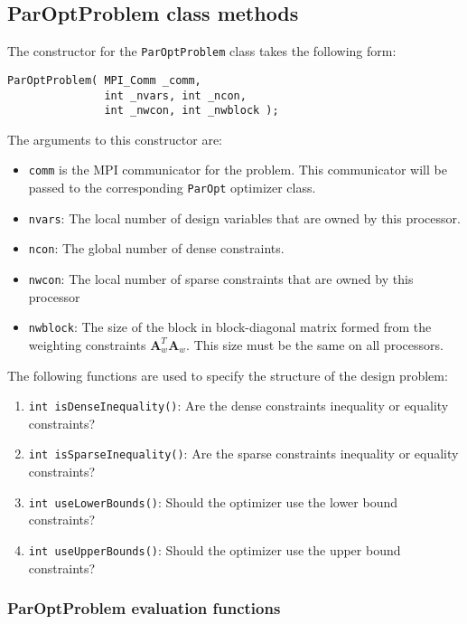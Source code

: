 \documentclass[12pt]{article}
\newcommand{\mb}{\mathbf}
\begin{document}
\subsection{ParOptProblem class methods}

The constructor for the \texttt{ParOptProblem} class takes the following form:
%
\begin{verbatim}
ParOptProblem( MPI_Comm _comm,
               int _nvars, int _ncon,
               int _nwcon, int _nwblock );
\end{verbatim}

The arguments to this constructor are:
\begin{itemize}
\item \texttt{comm} is the MPI communicator for the problem. 
This communicator will be passed to the corresponding \texttt{ParOpt} optimizer class.

\item \texttt{nvars}: The local number of design variables that are owned by this processor.

\item \texttt{ncon}: The global number of dense constraints.

\item \texttt{nwcon}: The local number of sparse constraints that are owned by this processor

\item \texttt{nwblock}: The size of the block in block-diagonal matrix formed from the weighting constraints $\mb{A}_{w}^{T}\mb{A}_{w}$. This size must be the same on all processors.
\end{itemize}

The following functions are used to specify the structure of the design problem:
\begin{enumerate}
\item \texttt{int isDenseInequality()}: Are the dense constraints inequality or equality constraints?
\item \texttt{int isSparseInequality()}: Are the sparse constraints inequality or equality constraints?
\item \texttt{int useLowerBounds()}: Should the optimizer use the lower bound constraints?
\item \texttt{int useUpperBounds()}: Should the optimizer use the upper bound constraints?
\end{enumerate}

\subsubsection{ParOptProblem evaluation functions}
\end{document}
